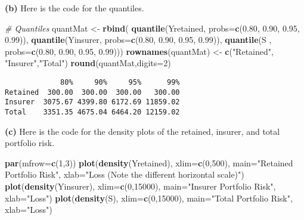 \documentclass[]{book}
\newenvironment{Shaded}{\begin{snugshade}}{\end{snugshade}}
\newcommand{\KeywordTok}[1]{\textcolor[rgb]{0.13,0.29,0.53}{\textbf{#1}}}
\newcommand{\DataTypeTok}[1]{\textcolor[rgb]{0.13,0.29,0.53}{#1}}
\newcommand{\DecValTok}[1]{\textcolor[rgb]{0.00,0.00,0.81}{#1}}
\newcommand{\FloatTok}[1]{\textcolor[rgb]{0.00,0.00,0.81}{#1}}
\newcommand{\StringTok}[1]{\textcolor[rgb]{0.31,0.60,0.02}{#1}}
\newcommand{\CommentTok}[1]{\textcolor[rgb]{0.56,0.35,0.01}{\textit{#1}}}
\newcommand{\NormalTok}[1]{#1}
\theoremstyle{definition}
\theoremstyle{definition}
\theoremstyle{definition}
\theoremstyle{remark}
\begin{document}
\textbf{(b)} Here is the code for the quantiles.

\begin{Shaded}
\begin{Highlighting}[]
\CommentTok{# Quantiles}
\NormalTok{quantMat <-}\StringTok{ }\KeywordTok{rbind}\NormalTok{(}
  \KeywordTok{quantile}\NormalTok{(Yretained, }\DataTypeTok{probs=}\KeywordTok{c}\NormalTok{(}\FloatTok{0.80}\NormalTok{, }\FloatTok{0.90}\NormalTok{, }\FloatTok{0.95}\NormalTok{, }\FloatTok{0.99}\NormalTok{)),}
  \KeywordTok{quantile}\NormalTok{(Yinsurer,  }\DataTypeTok{probs=}\KeywordTok{c}\NormalTok{(}\FloatTok{0.80}\NormalTok{, }\FloatTok{0.90}\NormalTok{, }\FloatTok{0.95}\NormalTok{, }\FloatTok{0.99}\NormalTok{)),}
  \KeywordTok{quantile}\NormalTok{(S       ,  }\DataTypeTok{probs=}\KeywordTok{c}\NormalTok{(}\FloatTok{0.80}\NormalTok{, }\FloatTok{0.90}\NormalTok{, }\FloatTok{0.95}\NormalTok{, }\FloatTok{0.99}\NormalTok{)))}
\KeywordTok{rownames}\NormalTok{(quantMat) <-}\StringTok{ }\KeywordTok{c}\NormalTok{(}\StringTok{"Retained"}\NormalTok{, }\StringTok{"Insurer"}\NormalTok{,}\StringTok{"Total"}\NormalTok{)}
\KeywordTok{round}\NormalTok{(quantMat,}\DataTypeTok{digits=}\DecValTok{2}\NormalTok{)}
\end{Highlighting}
\end{Shaded}

\begin{verbatim}
             80%     90%     95%      99%
Retained  300.00  300.00  300.00   300.00
Insurer  3075.67 4399.80 6172.69 11859.02
Total    3351.35 4675.04 6464.20 12159.02
\end{verbatim}

\textbf{(c)} Here is the code for the density plots of the retained,
insurer, and total portfolio risk.

\begin{Shaded}
\begin{Highlighting}[]
\KeywordTok{par}\NormalTok{(}\DataTypeTok{mfrow=}\KeywordTok{c}\NormalTok{(}\DecValTok{1}\NormalTok{,}\DecValTok{3}\NormalTok{))}
\KeywordTok{plot}\NormalTok{(}\KeywordTok{density}\NormalTok{(Yretained), }\DataTypeTok{xlim=}\KeywordTok{c}\NormalTok{(}\DecValTok{0}\NormalTok{,}\DecValTok{500}\NormalTok{), }\DataTypeTok{main=}\StringTok{"Retained Portfolio Risk"}\NormalTok{, }\DataTypeTok{xlab=}\StringTok{"Loss (Note the different horizontal scale)"}\NormalTok{)}
\KeywordTok{plot}\NormalTok{(}\KeywordTok{density}\NormalTok{(Yinsurer), }\DataTypeTok{xlim=}\KeywordTok{c}\NormalTok{(}\DecValTok{0}\NormalTok{,}\DecValTok{15000}\NormalTok{), }\DataTypeTok{main=}\StringTok{"Insurer Portfolio Risk"}\NormalTok{, }\DataTypeTok{xlab=}\StringTok{"Loss"}\NormalTok{)}
\KeywordTok{plot}\NormalTok{(}\KeywordTok{density}\NormalTok{(S), }\DataTypeTok{xlim=}\KeywordTok{c}\NormalTok{(}\DecValTok{0}\NormalTok{,}\DecValTok{15000}\NormalTok{), }\DataTypeTok{main=}\StringTok{"Total Portfolio Risk"}\NormalTok{, }\DataTypeTok{xlab=}\StringTok{"Loss"}\NormalTok{)}
\end{Highlighting}
\end{Shaded}
\end{document}
